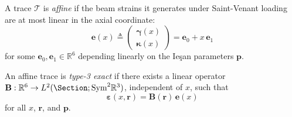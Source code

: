 

\begin{definition}
A trace $\mathcal{T}$ is \emph{affine} if the beam strains it generates under 
Saint-Venant loading are at most linear in the axial coordinate:
\begin{equation*}
\bm{e}(x) \triangleq \begin{pmatrix} \bm{\gamma}(x) \\ \bm{\kappa}(x) \end{pmatrix} 
= \bm{e}_0 + x\,\bm{e}_1
\end{equation*}
for some $\bm{e}_0, \bm{e}_1 \in \mathbb{R}^6$ depending linearly on the 
Ieşan parameters $\bm{p}$.
\end{definition}


\begin{definition}\label{def:type3-exact}
An affine trace is \emph{type-3 exact} if there exists a linear operator 
$\mathbf{B}: \mathbb{R}^6 \to L^2(\Section; \mathrm{Sym}^2\mathbb{R}^3)$, 
independent of $x$, such that
\begin{equation}
\bm{\varepsilon}(x, \bm{r}) = \mathbf{B}(\bm{r})\,\bm{e}(x)
\label{eq:type3-exact}
\end{equation}
for all $x$, $\bm{r}$, and $\bm{p}$.
\end{definition}

